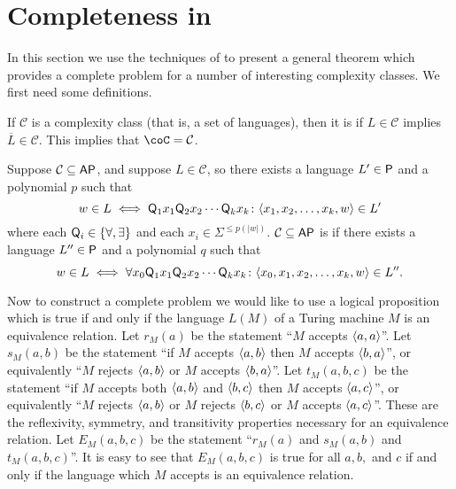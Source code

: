 \section{Completeness in \texorpdfstring{\AP}{AP}}

In this section we use the techniques of \cite[Theorem~8.7]{bcffm} to present a general theorem which provides a complete problem for a number of interesting complexity classes.
We first need some definitions.

If $\mathcal{C}$ is a complexity class (that is, a set of languages), then it is  if $L\in\mathcal{C}$ implies $\overline{L}\in\mathcal{C}$.
This implies that $\coC=\mathcal{C}$.

Suppose $\mathcal{C}\subseteq\AP$, and suppose $L\in\mathcal{C}$, so there exists a language $L'\in\P$ and a polynomial $p$ such that
\begin{displaymath}
  w\in L \iff \Q_1x_1\Q_2x_2\cdots \Q_kx_k\colon \langle x_1, x_2, \ldots, x_k, w\rangle\in L'
\end{displaymath}
where each $\Q_i\in\{\forall, \exists\}$ and each $x_i\in\Sigma^{\leq p(|w|)}$.
$\mathcal{C}\subseteq\AP$ is  if there exists a language $L''\in\P$ and a polynomial $q$ such that
\begin{displaymath}
  w\in L \iff \forall x_0 \Q_1x_1\Q_2x_2\cdots \Q_kx_k\colon \langle x_0, x_1, x_2, \ldots, x_k, w \rangle\in L''.
\end{displaymath}

Now to construct a complete problem we would like to use a logical proposition which is true if and only if the language $L(M)$ of a Turing machine $M$ is an equivalence relation.
Let $r_M(a)$ be the statement ``$M$ accepts $\pair{a}{a}$''.
Let $s_M(a,b)$ be the statement ``if $M$ accepts $\pair{a}{b}$ then $M$ accepts $\pair{b}{a}$'', or equivalently ``$M$ rejects $\pair{a}{b}$ or $M$ accepts $\pair{b}{a}$''.
Let $t_M(a,b,c)$ be the statement ``if $M$ accepts both $\pair{a}{b}$ and $\pair{b}{c}$ then $M$ accepts $\pair{a}{c}$'', or equivalently ``$M$ rejects $\pair{a}{b}$ or $M$ rejects $\pair{b}{c}$ or $M$ accepts $\pair{a}{c}$''.
These are the reflexivity, symmetry, and transitivity properties necessary for an equivalence relation.
Let $E_M(a, b, c)$ be the statement ``$r_M(a)$ and $s_M(a, b)$ and $t_M(a, b, c)$''.
It is easy to see that $E_M(a, b, c)$ is true for all $a,b,$ and $c$ if and only if the language which $M$ accepts is an equivalence relation.

